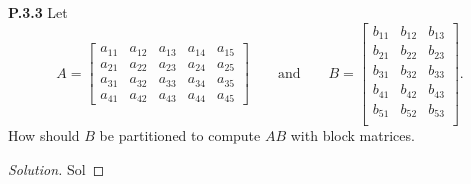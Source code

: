 \documentclass[12pt]{amsart}
\newenvironment{solution}
{\begin{proof}[Solution]}
{\end{proof}}
\begin{document}
\begin{onehalfspace}
        \noindent\textbf{P.3.3} Let
        \begin{displaymath}
            A = \left[\begin{array}{c|cc|cc}
                          a_{11} & a_{12} & a_{13} & a_{14} & a_{15} \\
                          \hline
                          a_{21} & a_{22} & a_{23} & a_{24} & a_{25} \\
                          a_{31} & a_{32} & a_{33} & a_{34} & a_{35} \\
                          \hline
                          a_{41} & a_{42} & a_{43} & a_{44} & a_{45}
            \end{array}\right]
            \qquad\text{and}\qquad
            B = \left[\begin{matrix}
                          b_{11} & b_{12} & b_{13} \\
                          b_{21} & b_{22} & b_{23} \\
                          b_{31} & b_{32} & b_{33} \\
                          b_{41} & b_{42} & b_{43} \\
                          b_{51} & b_{52} & b_{53} \\
            \end{matrix}\right].
        \end{displaymath}
        How should $B$ be partitioned to compute $AB$ with block matrices.
        \begin{solution}
            Sol
        \end{solution}

    \end{onehalfspace}
\end{document}
